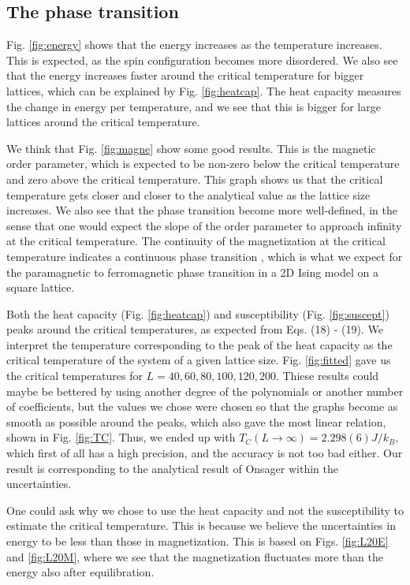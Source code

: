\documentclass[%
 reprint,
nofootinbib,
aps,
]{revtex4-1}
\begin{document}
\subsection{The phase transition}
Fig. \vref{fig:energy} shows that the energy increases as the temperature increases. This is expected, as the spin configuration becomes more disordered. We also see that the energy increases faster around the critical temperature for bigger lattices, which can be explained by Fig. \vref{fig:heatcap}. The heat capacity measures the change in energy per temperature, and we see that this is bigger for large lattices around the critical temperature.

We think that Fig. \vref{fig:magne} show some good results. This is the magnetic order parameter, which is expected to be non-zero below the critical temperature and zero above the critical temperature. This graph shows us that the critical temperature gets closer and closer to the analytical value as the lattice size increases. We also see that the phase transition become more well-defined, in the sense that one would expect the slope of the order parameter to approach infinity at the critical temperature. The continuity of the magnetization at the critical temperature indicates a continuous phase transition \cite{blundell}, which is what we expect for the paramagnetic to ferromagnetic phase transition in a 2D Ising model on a square lattice.

Both the heat capacity (Fig. \vref{fig:heatcap}) and susceptibility (Fig. \vref{fig:suscept}) peaks around the critical temperatures, as expected from Eqs. (18) - (19). We interpret the temperature corresponding to the peak of the heat capacity as the critical temperature of the system of a given lattice size. Fig. \vref{fig:fitted} gave us the critical temperatures for $L = 40, 60, 80, 100, 120, 200$. Thiese results could maybe be bettered by using another degree of the polynomials or another number of coefficients, but the values we chose were chosen so that the graphs become as smooth as possible around the peaks, which also gave the most linear relation, shown in Fig. \vref{fig:TC}. Thus, we ended up with $T_C(L\to\infty) = 2.298(6)J/k_B$, which first of all has a high precision, and the accuracy is not too bad either. Our result is corresponding to the analytical result of Onsager within the uncertainties. 

One could ask why we chose to use the heat capacity and not the susceptibility to estimate the critical temperature. This is because we believe the uncertainties in energy to be less than those in magnetization. This is based on Figs. \ref{fig:L20E} and \vref{fig:L20M}, where we see that the magnetization fluctuates more than the energy also after equilibration. 
\end{document}
